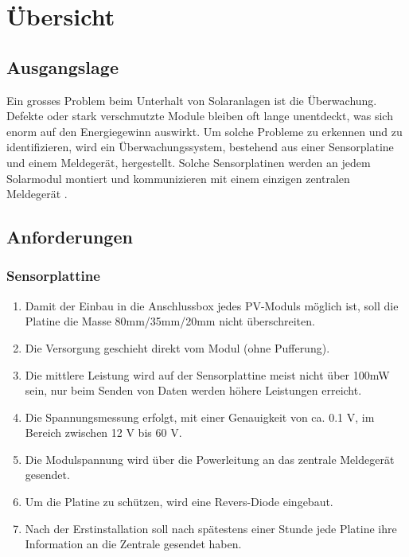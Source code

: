%
%
%
\section{Übersicht}
\subsection{Ausgangslage}
Ein grosses Problem beim Unterhalt von Solaranlagen ist die Überwachung. Defekte oder stark verschmutzte Module bleiben oft lange unentdeckt, was sich enorm auf den Energiegewinn auswirkt. Um solche Probleme zu erkennen und zu identifizieren, wird ein Überwachungssystem, bestehend aus einer Sensorplatine und einem Meldegerät, hergestellt. Solche Sensorplatinen werden an jedem Solarmodul montiert und kommunizieren mit einem einzigen zentralen Meldegerät .
\subsection{Anforderungen}
\subsubsection{Sensorplattine}
\begin{enumerate}
\item Damit der Einbau in die Anschlussbox jedes PV-Moduls möglich ist, soll die Platine die Masse 80mm/35mm/20mm nicht überschreiten.
\item Die Versorgung geschieht direkt vom Modul (ohne Pufferung).
\item Die mittlere Leistung wird auf der Sensorplattine meist nicht über 100mW sein, nur beim Senden von Daten werden höhere Leistungen erreicht.
\item	Die Spannungsmessung erfolgt, mit einer Genauigkeit von ca. 0.1 V, im Bereich zwischen 12 V bis 60 V.
\item	Die Modulspannung wird über die Powerleitung an das zentrale Meldegerät gesendet.
\item Um die Platine zu schützen, wird eine Revers-Diode eingebaut.
\item Nach der Erstinstallation soll nach spätestens einer Stunde jede Platine ihre Information an die Zentrale gesendet haben.
\end{enumerate}

